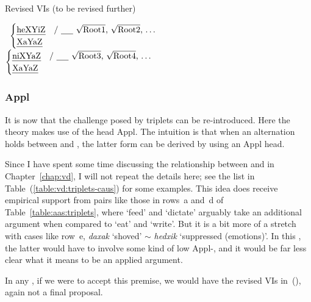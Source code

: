 \begin{exe}
\begin{xlist}
\begin{exe}
\begin{exe}
\begin{xlist}
\begin{exe}
\begin{exe}
\begin{exe}
\begin{exe}
\begin{exe}
\begin{xlist}
\begin{exe}
\begin{exe}
\begin{xlist}
 \begin{exe}
 \ex  Revised VIs (to be revised further) 
 \begin{xlist} 
 	\ex  {\vds} \lra~$\begin{cases} 
		\text{\thif} & \text{/ \trace~\root{Root1}, \root{Root2}, \dots}\\
		\text{\tkal} & \\
		\end{cases}$
 	\ex  {\vzs} \lra~$\begin{cases} 
		\text{\tnif} & \text{/ \trace~\root{Root3}, \root{Root4}, \dots}\\
		\text{\tkal} & \\
		\end{cases}$
 \z
\z 


		\subsubsection{Appl}
It is now that the challenge posed by triplets can be re-introduced. Here the theory makes use of the  head Appl. The intuition is that when an alternation holds between {\tkal} and {\thif}, the latter form can be derived by using an Appl head.

Since I have spent some time discussing the relationship between {\tkal} and {\thif} in Chapter~\ref{chap:vd}, I will not repeat the details here; see the list in Table~(\ref{table:vd:triplets-caus}) for some examples. This idea does receive empirical support from pairs like those in rows~a and~d of Table~\ref{table:aas:triplets}, where `feed' and `dictate' arguably take an additional argument when compared to `eat' and `write'. But it is a bit more of a stretch with cases like row~e, \emph{daxak} `shoved' $\sim$ \emph{hedxik} `suppressed (emotions)'. In this , the latter would have to involve some kind of low Appl-, and it would be far less clear what it means to be an applied argument.

In any , if we were to accept this premise, we would have the revised VIs in~(\nextx), again not a final proposal.


\end{xlist}
\end{exe}
\end{xlist}
\end{exe}
\end{exe}
\end{xlist}
\end{exe}
\end{exe}
\end{exe}
\end{exe}
\end{exe}
\end{xlist}
\end{exe}
\end{exe}
\end{xlist}
\end{exe}
